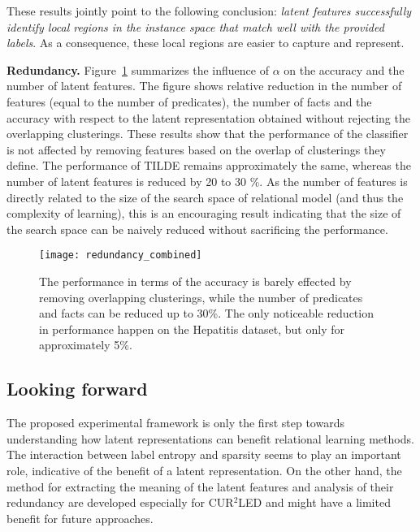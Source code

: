 These results jointly point to the following conclusion: \textit{latent features successfully identify local regions in the instance space that match well with the provided labels}.
As a consequence, these local regions are easier to capture and represent.









\textbf{Redundancy.}
Figure~\ref{fig:Redundancy} summarizes the influence of $\alpha$ on the accuracy and the number of latent features.
The figure shows relative reduction in the number of features (equal to the number of predicates), the number of facts and the accuracy with  respect to the latent representation obtained without rejecting the overlapping clusterings.
These results show that the performance of the classifier is not affected by removing features based on the overlap of clusterings they define.
The performance of TILDE remains approximately the same, whereas the number of latent features is reduced by 20 to 30 \%.
As the number of features is directly related to the size of the search space of relational model (and thus the complexity of learning), this is an encouraging result indicating that the size of the search space can be naively reduced without sacrificing the performance.








\begin{figure}[t]
	\centering
	\medskip
    \texttt{[image: redundancy\_combined]}
    \caption{The performance in terms of the accuracy is barely effected by removing overlapping clusterings, while the number of predicates and facts can be reduced up to 30\%. The only noticeable reduction in performance happen on the Hepatitis dataset, but only for approximately 5\%.   }
    \label{fig:Redundancy}
\end{figure}







\subsection{Looking forward}


The proposed experimental framework is only the first step towards understanding how latent representations can benefit relational learning methods.
The interaction between label entropy and sparsity seems to play an important role, indicative of the benefit of a latent representation.
On the other hand, the method for extracting the meaning of the latent features and analysis of their redundancy are developed especially for CUR$^2$LED and might have a limited benefit for future approaches.



